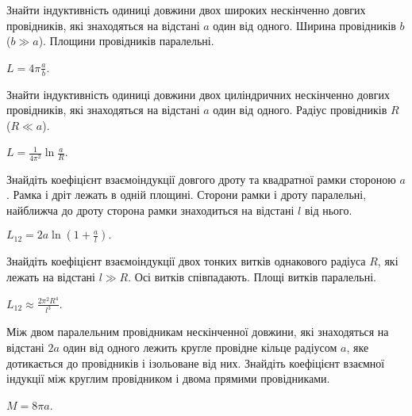 \begin{problem}\label{prb:inductance_two_plates}
Знайти індуктивність одиниці довжини двох широких нескінченно довгих провідників, які знаходяться на відстані $a$ один від одного. Ширина провідників $b$ ($b \gg a$). Площини провідників паралельні.
\begin{solution}
	$L = 4\pi\frac{a}{b}$.
\end{solution}
\end{problem}

\begin{problem}\label{prb:inductance_two_wires}
Знайти індуктивність одиниці довжини двох циліндричних нескінченно довгих провідників, які знаходяться на відстані $a$ один від одного. Радіус провідників $R$ ($R \ll a$).
\begin{solution}
	$L = \frac{1}{4\pi^2}\ln\frac{a}{R}$.
\end{solution}
\end{problem}

\begin{problem}
    Знайдіть коефіцієнт взаємоіндукції довгого дроту та квадратної рамки стороною $a$. Рамка і дріт лежать в одній площині. Сторони рамки і дроту паралельні, найближча до дроту сторона рамки знаходиться на відстані $l$ від нього.
\begin{solution}
	$L_{12} = 2a\ln\left( 1 + \frac{a}{l}\right).$
\end{solution}
\end{problem}

\begin{problem}
    Знайдіть коефіцієнт взаємоіндукції двох тонких витків однакового радіуса $R$, які лежать на відстані $l \gg R$. Осі витків співпадають. Площі витків паралельні.
\begin{solution}
	$L_{12} \approx \frac{2\pi^2R^4}{l^3}$.
\end{solution}
\end{problem}


\begin{problem}
Між двом паралельним провідникам нескінченної довжини, які знаходяться на відстані $2a$ один від одного лежить кругле провідне кільце радіусом $a$, яке дотикається до провідників і ізольоване від них. Знайдіть коефіцієнт взаємної індукції між круглим провідником і двома прямими провідниками.
\begin{solution}
	$M = 8\pi a$.
\end{solution}
\end{problem}

